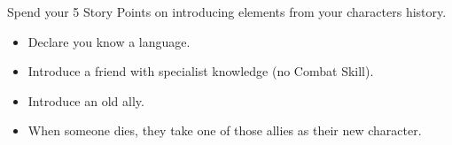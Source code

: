 \begin{multicols}{2}
Spend your 5 Story Points on introducing elements from your characters history.

\begin{itemize}

  \item
  Declare you know a language.
  \item
  Introduce a friend with specialist knowledge (no Combat Skill).
  \item
  Introduce an old ally.
  \item
  When someone dies, they take one of those allies as their new character.

\end{itemize}

\end{multicols}
